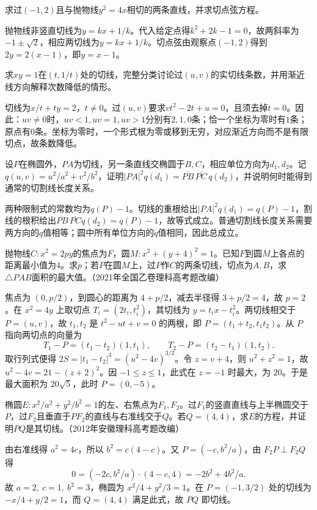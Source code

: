 求过\((-1,2)\)且与抛物线\(y^2=4x\)相切的两条直线，并求切点弦方程。
\par
\solutionanswer
抛物线非竖直切线为\(y=kx+1/k\)。代入给定点得\(k^2+2k-1=0\)，故两斜率为\(-1\pm\sqrt2\)，相应两切线为\(y=kx+1/k\)。切点弦由观察点\((-1,2)\)得到\(2y=2(x-1)\)，即\(y=x-1\)。


求\(xy=1\)在\((t,1/t)\)处的切线，完整分类讨论过\((u,v)\)的实切线条数，并用渐近线方向解释次数降低的情形。
\par
\solutionanswer
切线为\(x/t+ty=2\)，\(t\ne0\)。过\((u,v)\)要求\(vt^2-2t+u=0\)，且须去掉\(t=0\)。因此：\(uv\ne0\)时，\(uv<1,uv=1,uv>1\)分别有\(2,1,0\)条；恰一个坐标为零时有\(1\)条；原点有\(0\)条。坐标为零时，一个形式根为零或移到无穷，对应渐近方向而不是有限切点，故条数降低。


设\(P\)在椭圆外，\(PA\)为切线，另一条直线交椭圆于\(B,C\)，相应单位方向为\(d_1,d_2\)。记\(q(u,v)=u^2/a^2+v^2/b^2\)，证明\(|PA|^2q(d_1)=\overline{PB}\,\overline{PC}\,q(d_2)\)，并说明何时能得到通常的切割线长度关系。
\par
\solutionanswer
两种限制式的常数均为\(q(P)-1\)。切线的重根给出\(|PA|^2q(d_1)=q(P)-1\)，割线的根积给出\(\overline{PB}\,\overline{PC}q(d_2)=q(P)-1\)，故等式成立。普通切割线长度关系需要两方向的\(q\)值相等；圆中所有单位方向的\(q\)值相同，因此总成立。


抛物线\(C:x^2=2py\)的焦点为\(F\)，圆\(M:x^2+(y+4)^2=1\)。已知\(F\)到圆\(M\)上各点的距离最小值为\(4\)。求\(p\)；若\(P\)在圆\(M\)上，过\(P\)作\(C\)的两条切线，切点为\(A,B\)，求\(\triangle PAB\)面积的最大值。（2021年全国乙卷理科高考题改编）
\par
\solutionanswer
焦点为 \((0,p/2)\)，到圆心的距离为 \(4+p/2\)，减去半径得 \(3+p/2=4\)，故 \(p=2\)。在 \(x^2=4y\) 上取切点 \(T_i=(2t_i,t_i^2)\)，其切线为 \(y=t_ix-t_i^2\)。两切线相交于 \(P=(u,v)\)，故 \(t_1,t_2\) 是 \(t^2-ut+v=0\) 的两根，即 \(P=(t_1+t_2,t_1t_2)\)。从 \(P\) 指向两切点的向量为
\[
 T_1-P=(t_1-t_2)(1,t_1),\qquad T_2-P=(t_2-t_1)(1,t_2).
\]
取行列式便得 \(2S=|t_1-t_2|^3=(u^2-4v)^{3/2}\)。令 \(z=v+4\)，则 \(u^2+z^2=1\)，故 \(u^2-4v=21-(z+2)^2\)。因 \(-1\le z\le1\)，此式在 \(z=-1\) 时最大，为 \(20\)。于是最大面积为 \(20\sqrt5\)，此时 \(P=(0,-5)\)。


椭圆\(E:x^2/a^2+y^2/b^2=1\)的左、右焦点为\(F_1,F_2\)。过\(F_1\)的竖直直线与上半椭圆交于\(P\)，过\(F_2\)且垂直于\(PF_2\)的直线与右准线交于\(Q\)。若\(Q=(4,4)\)，求\(E\)的方程，并证明\(PQ\)是其切线。（2012年安徽理科高考题改编）
\par
\solutionanswer
由右准线得 \(a^2=4c\)，所以 \(b^2=c(4-c)\)。又 \(P=(-c,b^2/a)\)，由 \(F_2P\perp F_2Q\) 得
\[
 0=(-2c,b^2/a)\cdot(4-c,4)=-2b^2+4b^2/a.
\]
故 \(a=2,\ c=1,\ b^2=3\)，椭圆为 \(x^2/4+y^2/3=1\)。在 \(P=(-1,3/2)\) 处的切线为 \(-x/4+y/2=1\)，而 \(Q=(4,4)\) 满足此式，故 \(PQ\) 即切线。

